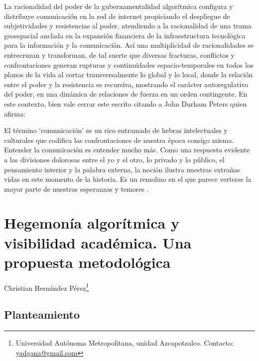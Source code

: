 \documentclass[
  spanish,
  11pt,
  a4paper,
]{scrbook}
\begin{document}
La racionalidad del poder de la gubernamentalidad algorítmica configura
y distribuye comunicación en la red de internet propiciando el
despliegue de subjetividades y resistencias al poder, atendiendo a la
racionalidad de una trama geoespacial anclada en la expansión financiera
de la infraestructura tecnológica para la información y la comunicación.
Así una multiplicidad de racionalidades se entrecruzan y transforman, de
tal suerte que diversas fracturas, conflictos y confrontaciones generan
rupturas y continuidades espacio-temporales en todos los planos de la
vida al cortar transversalmente lo global y lo local, donde la relación
entre el poder y la resistencia es recursiva, mostrando el carácter
autoregulativo del poder, en una dinámica de relaciones de fuerza en un
orden contingente. En este contexto, bien vale cerrar este escrito
citando a John Durham Peters quien afirma:

El término `comunicación' es un rico entramado de hebras intelectuales y
culturales que codifica las confrontaciones de nuestra época consigo
misma. Entender la comunicación es entender mucho más. Como una
respuesta evidente a las divisiones dolorosas entre el yo y el otro, lo
privado y lo público, el pensamiento interior y la palabra externa, la
noción ilustra nuestras extrañas vidas en este momento de la historia.
Es un remolino en el que parece verterse la mayor parte de nuestras
esperanzas y temores \autocite[18-19]{DurhamPeters2014}.

\printbibliography[heading=subbibliography, title={Referencias Bibliográficas}]

\chapter{Hegemonía algorítmica y visibilidad académica. Una propuesta
metodológica}\label{hegemonuxeda-algoruxedtmica-y-visibilidad-acaduxe9mica.-una-propuesta-metodoluxf3gica}


\begin{flushright}
\Large Christian Hernández Pérez\footnote{Universidad Autónoma Metropolitana, unidad Azcapotzalco. Contacto: \href{yadgana@gmail.com}{yadgana@gmail.com}}
\end{flushright}

\section*{Planteamiento}\label{planteamiento}
\end{document}
